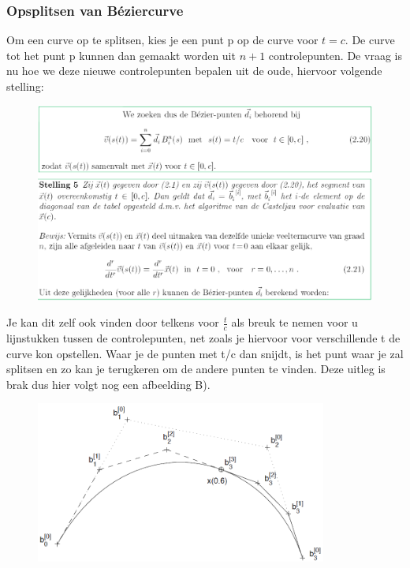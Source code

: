 \documentclass[12pt,a4paper]{article}
\begin{document}
	\subsubsection*{Opsplitsen van Béziercurve}
	Om een curve op te splitsen, kies je een punt p op de curve voor $t=c$. De curve tot het punt p kunnen dan gemaakt worden uit $n+1$ controlepunten. De vraag is nu hoe we deze nieuwe controlepunten bepalen uit de oude, hiervoor volgende stelling: 
	\begin{figure}[H]
		\centering
		\includegraphics[width=0.8\linewidth]{afbeeldingen/Beziercurven/opsplitsing-stelling}
		\label{fig:opsplitsing-stelling}
	\end{figure}
	Je kan dit zelf ook vinden door telkens voor $\tfrac{t}{c}$ als breuk te nemen voor u lijnstukken tussen de controlepunten, net zoals je hiervoor voor verschillende t de curve kon opstellen. Waar je de punten met t/c dan snijdt, is het punt waar je zal splitsen en zo kan je terugkeren om de andere punten te vinden. Deze uitleg is brak dus hier volgt nog een afbeelding B). 
	\begin{figure}[H]
		\centering
		\includegraphics[width=0.7\linewidth]{afbeeldingen/Beziercurven/opsplitsing-vb}
		\label{fig:opsplitsing-vb}
	\end{figure}
	
	
\end{document}
